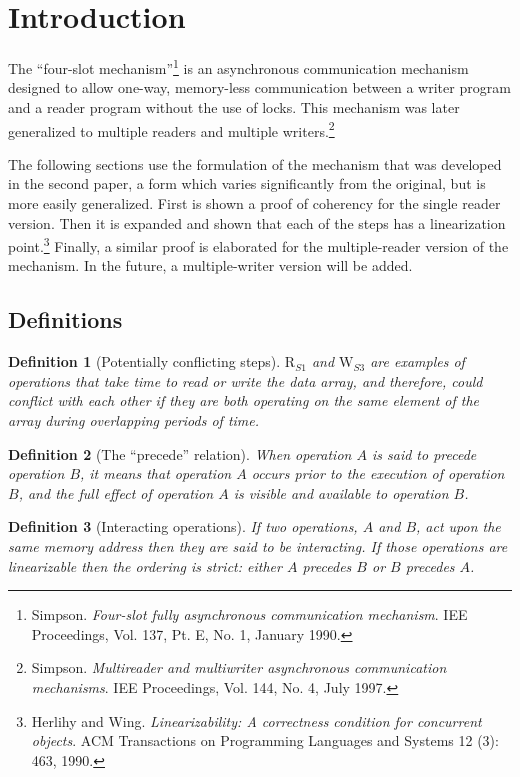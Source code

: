 \documentclass{article}
\newtheorem{defn}{Definition}
\newcommand\RS[1]{\ensuremath{\text{R}_{S#1}}}
\newcommand\WS[1]{\ensuremath{\text{W}_{S#1}}}
\begin{document}
\section{Introduction}
The ``four-slot mechanism''\footnote{Simpson. {\em Four-slot fully
    asynchronous communication mechanism}. IEE Proceedings, Vol. 137,
  Pt. E, No. 1, January 1990.} is an asynchronous communication
mechanism designed to allow one-way, memory-less communication between
a writer program and a reader program without the use of locks. This
mechanism was later generalized to multiple readers and multiple
writers.\footnote{Simpson. {\em Multireader and multiwriter
    asynchronous communication mechanisms}. IEE Proceedings, Vol. 144,
  No. 4, July 1997.}

The following sections use the formulation of the mechanism that was
developed in the second paper, a form which varies significantly from
the original, but is more easily generalized. First is shown a proof
of coherency for the single reader version. Then it is expanded and
shown that each of the steps has a linearization
point.\footnote{Herlihy and Wing. {\em Linearizability: A correctness condition for concurrent
  objects}. ACM Transactions on Programming Languages and Systems 12
  (3): 463, 1990.} Finally, a similar proof is elaborated for the
multiple-reader version of the mechanism. In the future, a
multiple-writer version will be added.

\subsection{Definitions}
\begin{defn}[Potentially conflicting steps]
  \RS1 and \WS3 are examples of operations that take time to read or
  write the data array, and therefore, could conflict with each other
  if they are both operating on the same element of the array during
  overlapping periods of time.
\end{defn}

\begin{defn}[The ``precede'' relation]
  When operation $A$ is said to precede operation $B$, it means that
  operation $A$ occurs prior to the execution of operation $B$, and
  the full effect of operation $A$ is visible and available to
  operation $B$.
\end{defn}

\begin{defn}[Interacting operations]
  If two operations, $A$ and $B$, act upon the same memory address
  then they are said to be interacting. If those operations are
  linearizable then the ordering is strict: either $A$ precedes $B$ or
  $B$ precedes $A$.
\end{defn}
\end{document}
